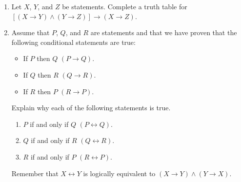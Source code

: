 \begin{previewactivity} \label{PA:provingequiv} \hfill

\begin{enumerate}
\item Let $X$, $Y$, and $Z$ be statements.  Complete a truth table for  \\$\left[ {\left( {X \to Y} \right) \wedge \left( {Y \to Z} \right)} \right] \to \left( {X \to Z} \right)$.

\item Assume that  $P$, $Q$, and  $R$  are statements and that we have proven that the following conditional statements are true:
\begin{multicols}{2}
\begin{itemize}
  \item If  $P$  then  $Q$  $\left( {P \to Q} \right)$.
  \item If  $Q$  then  $R$  $\left( {Q \to R} \right)$.
  \item If  $R$  then  $P$  $\left( {R \to P} \right)$.
\end{itemize}
\end{multicols}
Explain why each of the following statements is true.
\begin{multicols}{2}
\begin{enumerate}
  \item $P$  if and only if  $Q$  $\left( {P \leftrightarrow Q} \right)$.
  \item $Q$  if and only if  $R$  $\left( {Q \leftrightarrow R} \right)$.
  \item $R$  if and only if  $P$  $\left( {R \leftrightarrow P} \right)$.
\end{enumerate}
\end{multicols} 
Remember that  $X \leftrightarrow Y$  is logically equivalent to  
$\left( {X \to Y} \right) \wedge \left( {Y \to X} \right)$.

\end{enumerate}
\end{previewactivity}
\hbreak


\endinput

